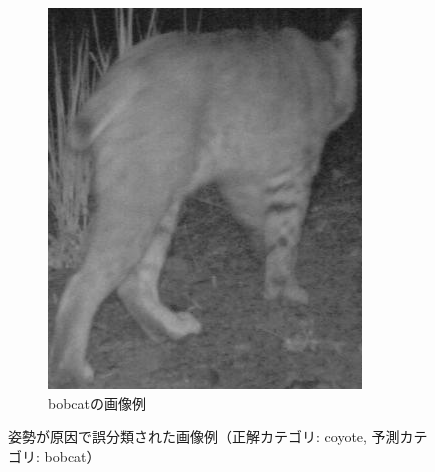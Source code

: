\begin{figure}[tbp]
\begin{subfigure}[b]{0.45\linewidth}
    \includegraphics[height=0.9\linewidth, keepaspectratio]{image/bobcat.png}
    \caption{bobcatの画像例}
    \label{fig:bobcat}
  \end{subfigure}
  \caption{姿勢が原因で誤分類された画像例（正解カテゴリ: coyote, 予測カテゴリ: bobcat）}
  \label{fig:animalback}
\end{figure}